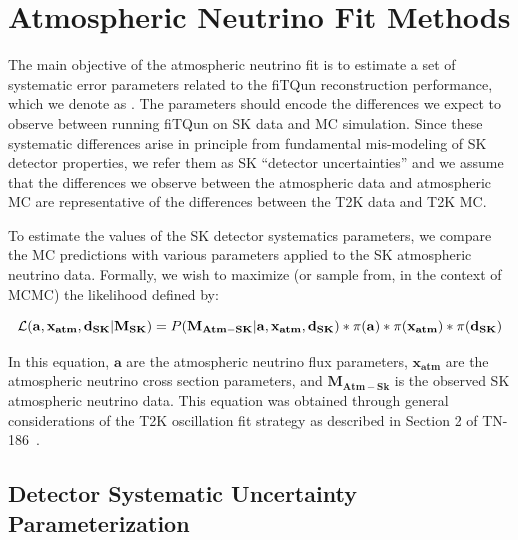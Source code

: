 


\section{Atmospheric Neutrino Fit Methods}
\label{sec:methods}

The main objective of the atmospheric neutrino fit is to estimate a set of
systematic error parameters related to the fiTQun reconstruction performance,
which we denote as \ldsk.  The \ldsk parameters should encode the differences 
we expect to observe between running fiTQun on SK data and MC simulation.
Since these systematic differences arise in principle from fundamental mis-modeling of SK detector properties,
we refer them as SK ``detector uncertainties'' and we assume that the differences we observe
between the atmospheric data and atmospheric MC are representative of the differences between the
T2K data and T2K MC. 

To estimate the values of the SK detector systematics parameters, we compare
the MC predictions with various \ldsk parameters applied to the SK atmospheric
neutrino data. Formally, we wish to maximize (or sample from, in the context of
MCMC) the likelihood defined by:

\begin{equation}
  \label{eq:likelihood}
  \mathcal{L}(\mathbf{a},\mathbf{x_{atm}},\mathbf{d_{SK}}|\mathbf{M_{SK}}) =
  P(\mathbf{M_{Atm-SK}}|\mathbf{a},\mathbf{x_{atm}},\mathbf{d_{SK}}) \ast \pi(\mathbf{a})
  \ast \pi(\mathbf{x_{atm}}) \ast \pi(\mathbf{d_{SK}})
\end{equation}

In this equation, $\mathbf{a}$ are the atmospheric neutrino flux parameters,
$\mathbf{x_{atm}}$ are the atmospheric neutrino cross section parameters, and
$\mathbf{M_{Atm-Sk}}$ is the observed SK atmospheric neutrino data. This
equation was obtained through general considerations of the T2K oscillation fit
strategy as described in Section 2 of TN-186~\cite{tn186}.


\subsection{Detector Systematic Uncertainty Parameterization}
\label{subsec:betapar}


